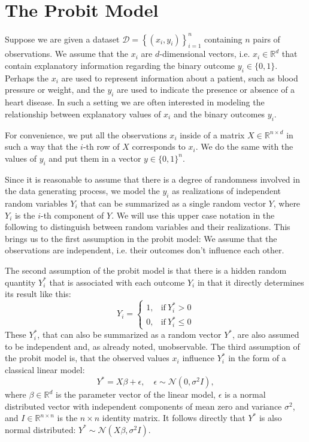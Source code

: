 \section{The Probit Model}

Suppose we are given a dataset
$\mathcal{D} = \left\{ (x_i, y_i) \right\}_{i=1}^n$
containing $n$ pairs of observations.
We assume that the $x_i$ are $d$-dimensional vectors, i.e.
$x_i \in \mathbb{R}^d$ that contain explanatory information regarding
the binary outcome $y_i \in \{ 0,  1 \}$.
Perhaps the $x_i$ are used to represent information about a patient,
such as blood pressure or weight, and the $y_i$ are used to indicate
the presence or absence of a heart disease.
In such a setting we are often interested in modeling the relationship
between explanatory values of $x_i$ and the binary outcomes $y_i$.

For convenience, we put all the observations $x_i$ inside of a
matrix $X \in \mathbb{R}^{n \times d}$ in such a way that
the $i$-th row of $X$ corresponds to $x_i$.
We do the same with the values of $y_i$ and put them in a
vector $y \in \{0, 1\}^n$.

Since it is reasonable to assume that there is a degree of randomness
involved in the data generating process, we model the $y_i$ as realizations
of independent random variables $Y_i$ that can be summarized
as a single random vector $Y$, where $Y_i$ is the $i$-th component
of $Y$. We will use this upper case notation
in the following to distinguish between random variables and their
realizations. This brings us to the first assumption in the probit model:
We assume that the observations are independent, i.e. their outcomes don't
influence each other.

The second assumption of the probit model is that there is
a hidden random quantity
$Y_i^\ast$ that is associated with each outcome $Y_i$ in that it
directly determines its result like this:
\begin{equation}
    Y_i =
    \begin{cases}
        1, & \text{if}\ Y_i^\ast > 0    \\
        0, & \text{if}\ Y_i^\ast \leq 0
    \end{cases}
\end{equation}
These $Y_i^\ast$, that can also be summarized as a random vector $Y^\ast$,
are also assumed to be independent and, as already noted, unobservable.
The third assumption of the probit model is, that the observed values
$x_i$ influence $Y_i^\ast$ in the form of a classical linear model:
\begin{equation}
    Y^\ast = X \beta + \epsilon, \quad \epsilon \sim \mathcal{N}(0, \sigma^2 I),
\end{equation}
where $\beta \in \mathbb{R}^d$ is the parameter vector of the linear model,
$\epsilon$ is a normal distributed vector with independent components of
mean zero and variance $\sigma^2$,
and
$I \in \mathbb{R}^{n \times n}$ is the $n \times n$ identity matrix.
It follows directly that $Y^\ast$ is also normal distributed:
$Y^\ast \sim \mathcal{N}(X \beta, \sigma^2 I)$.

